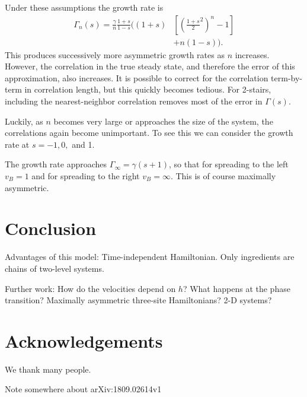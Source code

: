 \documentclass[aps,prx,reprint,superscriptaddress, longbibliography]{revtex4-1}
\newcommand{\charlie}[1]{ {\color{Magenta} {{#1}}}}
\begin{document}
Under these assumptions the growth rate is
\begin{align}
\Gamma_n(s) = \frac{\gamma}{n}\frac{1+s}{1-s}\bigg(
	(1+s)&\left[\left(\frac{1+s}{2}^2\right)^n-1\right]\nonumber \\
	&+n(1-s)\bigg). \label{eqn:growthrate}
\end{align}
This produces successively more asymmetric growth rates as $n$ increases. However, the correlation in the true steady state, and therefore the error of this approximation, also increases. It is possible to correct for the correlation term-by-term in correlation length, but this quickly becomes tedious. For 2-stairs, including the nearest-neighbor correlation removes most of the error in $\Gamma(s)$.

Luckily, as $n$ becomes very large or approaches the size of the system, the correlations again become unimportant. To see this we can consider the growth rate at $s = -1, 0,$ and 1.

The growth rate approaches $\Gamma_\infty = \gamma(s+1)$, so that for spreading to the left $v_B=1$ and for spreading to the right $v_B=\infty$. This is of course maximally asymmetric. 

\section{Conclusion}

Advantages of this model:
Time-independent Hamiltonian.
Only ingredients are chains of two-level systems.

Further work:
How do the velocities depend on $h$?
What happens at the phase transition?
Maximally asymmetric three-site Hamiltonians?
2-D systems?


\section*{Acknowledgements}
We thank many people.

\charlie{Note somewhere about arXiv:1809.02614v1}
\end{document}
